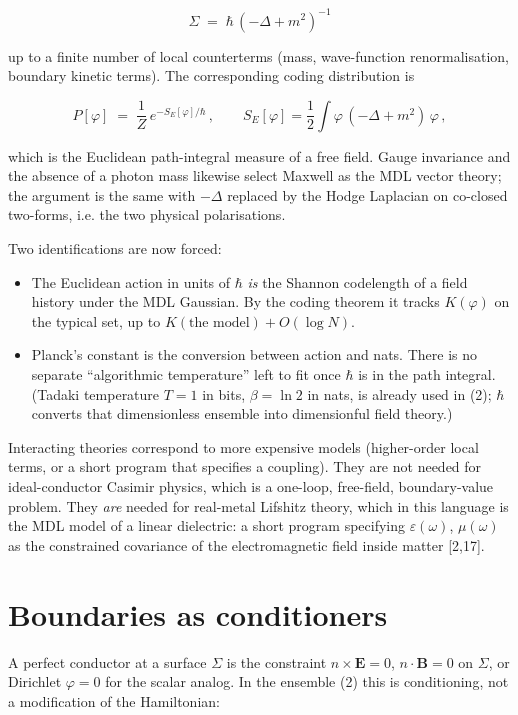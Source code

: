 \documentclass[11pt,letterpaper]{article}
\begin{document}
\[
\Sigma\;=\;\hbar\,(-\Delta+m^{2})^{-1}
\tag{6}
\]


up to a finite number of local counterterms (mass, wave-function renormalisation, boundary kinetic terms). The corresponding coding distribution is


\[
P[\varphi]\;=\;\frac{1}{Z}\,e^{-S_E[\varphi]/\hbar}\,,\qquad
S_E[\varphi]=\frac12\int\varphi\,(-\Delta+m^{2})\,\varphi\,,
\tag{7}
\]


which is the Euclidean path-integral measure of a free field. Gauge invariance and the absence of a photon mass likewise select Maxwell as the MDL vector theory; the argument is the same with \(-\Delta\) replaced by the Hodge Laplacian on co-closed two-forms, i.e. the two physical polarisations.


Two identifications are now forced:


\begin{itemize}
\item The Euclidean action in units of \(\hbar\) \emph{is} the Shannon codelength of a field history under the MDL Gaussian. By the coding theorem it tracks \(K(\varphi)\) on the typical set, up to \(K(\text{the model})+O(\log N)\).
\item Planck’s constant is the conversion between action and nats. There is no separate “algorithmic temperature” left to fit once \(\hbar\) is in the path integral. (Tadaki temperature \(T=1\) in bits, \(\beta=\ln 2\) in nats, is already used in (2); \(\hbar\) converts that dimensionless ensemble into dimensionful field theory.)
\end{itemize}


Interacting theories correspond to more expensive models (higher-order local terms, or a short program that specifies a coupling). They are not needed for ideal-conductor Casimir physics, which is a one-loop, free-field, boundary-value problem. They \emph{are} needed for real-metal Lifshitz theory, which in this language is the MDL model of a linear dielectric: a short program specifying \(\varepsilon(\omega)\), \(\mu(\omega)\) as the constrained covariance of the electromagnetic field inside matter [2,17].



\section{Boundaries as conditioners}


A perfect conductor at a surface \(\Sigma\) is the constraint \(n\times\mathbf{E}=0\), \(n\cdot\mathbf{B}=0\) on \(\Sigma\), or Dirichlet \(\varphi=0\) for the scalar analog. In the ensemble (2) this is conditioning, not a modification of the Hamiltonian:
\end{document}
